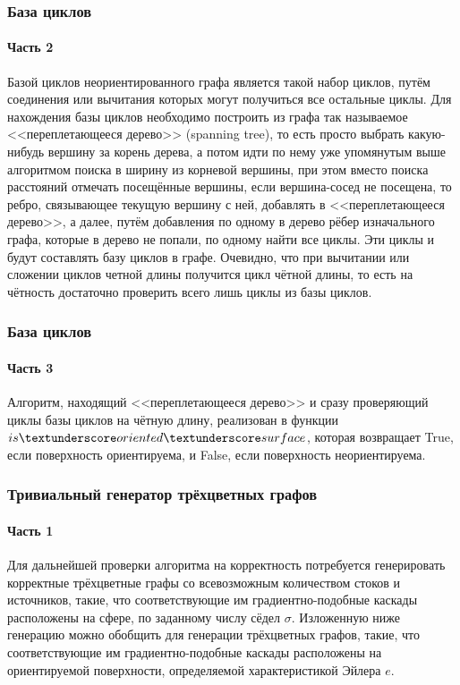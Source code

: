 \documentclass[aspectratio=169]{beamer}
\begin{document}
\begin{frame}
	\frametitle{База циклов}
	\framesubtitle{Часть 2}
	Базой циклов неориентированного графа является такой набор циклов, путём соединения или вычитания которых могут получиться все остальные циклы. Для нахождения базы циклов необходимо построить из графа так называемое <<переплетающееся дерево>> (spanning tree), то есть просто выбрать какую-нибудь вершину за корень дерева, а потом идти по нему уже упомянутым выше алгоритмом поиска в ширину из корневой вершины, при этом вместо поиска расстояний отмечать посещённые вершины, если вершина-сосед не посещена, то ребро, связывающее текущую вершину с ней, добавлять в <<переплетающееся дерево>>, а далее, путём добавления по одному в дерево рёбер изначального графа, которые в дерево не попали, по одному найти все циклы. Эти циклы и будут составлять базу циклов в графе. Очевидно, что при вычитании или сложении циклов четной длины получится цикл чётной длины, то есть на чётность достаточно проверить всего лишь циклы из базы циклов.
\end{frame}

\begin{frame}
	\frametitle{База циклов}
	\framesubtitle{Часть 3}
	Алгоритм, находящий <<переплетающееся дерево>> и сразу проверяющий циклы базы циклов на чётную длину, реализован в функции $is \textunderscore oriented \textunderscore surface$, которая возвращает True, если поверхность ориентируема, и False, если поверхность неориентируема.
\end{frame}

\begin{frame}
	\frametitle{Тривиальный генератор трёхцветных графов}
	\framesubtitle{Часть 1}
	Для дальнейшей проверки алгоритма на корректность потребуется генерировать корректные трёхцветные графы со всевозможным количеством стоков и источников, такие, что соответствующие им градиентно-подобные каскады расположены на сфере, по заданному числу сёдел $\sigma$. Изложенную ниже генерацию можно обобщить для генерации трёхцветных графов, такие, что соответствующие им градиентно-подобные каскады расположены на ориентируемой поверхности, определяемой характеристикой Эйлера $e$.
\end{frame}
\end{document}
